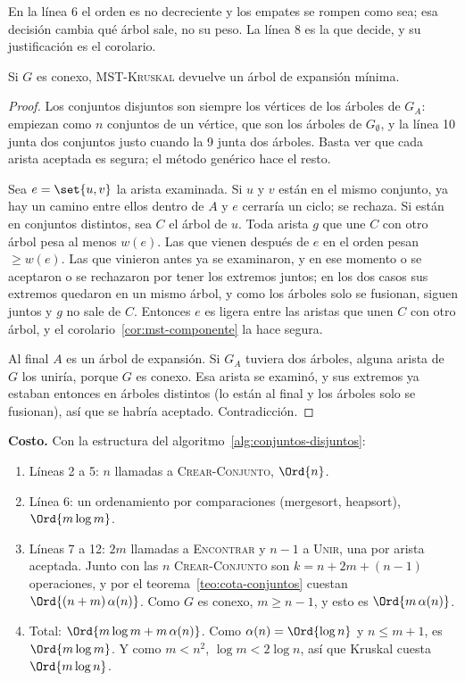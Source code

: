 \documentclass[11pt,letterpaper]{article}
\begin{document}
En la línea 6 el orden es no decreciente y los empates se rompen como
sea; esa decisión cambia qué árbol sale, no su peso. La línea 8 es la
que decide, y su justificación es el corolario.

\begin{proposicion}
  \label{prop:kruskal-mst}
  Si $G$ es conexo, \textsc{MST-Kruskal} devuelve un árbol de
  expansión mínima.
\end{proposicion}

\begin{proof}
  Los conjuntos disjuntos son siempre los vértices de los árboles de
  $G_A$: empiezan como $n$ conjuntos de un vértice, que son los árboles
  de $G_\emptyset$, y la línea 10 junta dos conjuntos justo cuando la
  9 junta dos árboles. Basta ver que cada arista aceptada es segura;
  el método genérico hace el resto.

  Sea $e = \set{u, v}$ la arista examinada. Si $u$ y $v$ están en el
  mismo conjunto, ya hay un camino entre ellos dentro de $A$ y $e$
  cerraría un ciclo; se rechaza. Si están en conjuntos distintos, sea
  $C$ el árbol de $u$. Toda arista $g$ que une $C$ con otro árbol pesa
  al menos $w(e)$. Las que vienen después de $e$ en el orden pesan
  $\ge w(e)$. Las que vinieron antes ya se examinaron, y en ese momento
  o se aceptaron o se rechazaron por tener los extremos juntos; en los
  dos casos sus extremos quedaron en un mismo árbol, y como los árboles
  solo se fusionan, siguen juntos y $g$ no sale de $C$. Entonces $e$ es
  ligera entre las aristas que unen $C$ con otro árbol, y el
  corolario~\ref{cor:mst-componente} la hace segura.

  Al final $A$ es un árbol de expansión. Si $G_A$ tuviera dos árboles,
  alguna arista de $G$ los uniría, porque $G$ es conexo. Esa arista se
  examinó, y sus extremos ya estaban entonces en árboles distintos
  (lo están al final y los árboles solo se fusionan), así que se habría
  aceptado. Contradicción.
\end{proof}

\textbf{Costo.} Con la estructura del
algoritmo~\ref{alg:conjuntos-disjuntos}:
\begin{enumerate}[itemsep=0.1em]
  \item Líneas 2 a 5: $n$ llamadas a \textsc{Crear-Conjunto}, $\Ord{n}$.
  \item Línea 6: un ordenamiento por comparaciones (mergesort,
        heapsort), $\Ord{m \log m}$.
  \item Líneas 7 a 12: $2m$ llamadas a \textsc{Encontrar} y $n - 1$ a
        \textsc{Unir}, una por arista aceptada. Junto con las $n$
        \textsc{Crear-Conjunto} son $k = n + 2m + (n - 1)$ operaciones,
        y por el teorema~\ref{teo:cota-conjuntos} cuestan
        $\Ord{(n + m)\,\alpha(n)}$. Como $G$ es conexo,
        $m \ge n - 1$, y esto es $\Ord{m\,\alpha(n)}$.
  \item Total: $\Ord{m \log m + m\,\alpha(n)}$. Como
        $\alpha(n) = \Ord{\log n}$ y $n \le m + 1$, es
        $\Ord{m \log m}$. Y como $m < n^2$, $\log m < 2 \log n$, así
        que Kruskal cuesta $\Ord{m \log n}$.
\end{enumerate}
\end{document}
